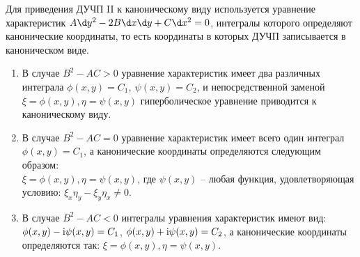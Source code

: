 \vspace*{.6em}
Для приведения ДУЧП II к каноническому виду используется уравнение
характеристик \( A\d y^2 - 2B\d x\d y + C\d x^2 = 0 \), интегралы которого
определяют канонические координаты, то есть координаты в которых ДУЧП
записывается в каноническом виде.
\begin{enumerate}
    \item В случае \( B^2 - AC > 0 \) уравнение характеристик имеет два
    различных интеграла \( \phi(x, y) = C_1,\ \psi(x, y) = C_2 \), и
    непосредственной заменой \( \xi =\phi(x, y), \eta = \psi(x, y) \)
    гиперболическое уравнение приводится к каноническому виду.

    \item В случае \( B^2 - AC = 0 \) уравнение характеристик имеет всего один
    интеграл\\
    \( \phi(x, y) = C_1 \), а канонические координаты определяются
    следующим образом:\\
    \( \xi =\phi(x, y), \eta = \psi(x, y) \), где
    \( \psi(x, y) \) -- любая функция, удовлетворяющая условию: \( \xi_x\eta_y -
    \xi_y\eta_x \ne 0 \).
    
    \item В случае \( B^2 - AC < 0 \) интегралы уравнения характеристик имеют
    вид:\\
    \( \phi(x, y)- \mathrm{i}\psi(x, y) = C_1 \), \( \phi(x, y) + \mathrm{i}\psi(x, y) =
    C_2 \), а канонические координаты определяются так: \( \xi =\phi(x, y),
    \eta = \psi(x, y) \).
\end{enumerate}

\newpage
